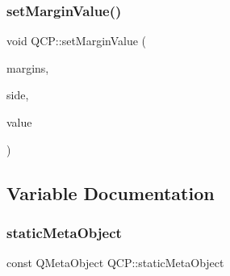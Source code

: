 \mbox{\label{namespace_q_c_p_afbf6e3084c108f2bb4372107945ee82f}} 
\subsubsection{\texorpdfstring{set\+Margin\+Value()}{setMarginValue()}}
{\footnotesize\ttfamily void Q\+C\+P\+::set\+Margin\+Value (\begin{DoxyParamCaption}\item[{Q\+Margins \&}]{margins,  }\item[{\hyperlink{namespace_q_c_p_a7e487e3e2ccb62ab7771065bab7cae54}{Q\+C\+P\+::\+Margin\+Side}}]{side,  }\item[{int}]{value }\end{DoxyParamCaption})\hspace{0.3cm}{\ttfamily [inline]}}



\subsection{Variable Documentation}
\mbox{\label{namespace_q_c_p_a07ffa1eb1537a3b1f218ff2a442b2017}} 
\subsubsection{\texorpdfstring{static\+Meta\+Object}{staticMetaObject}}
{\footnotesize\ttfamily const Q\+Meta\+Object Q\+C\+P\+::static\+Meta\+Object}

